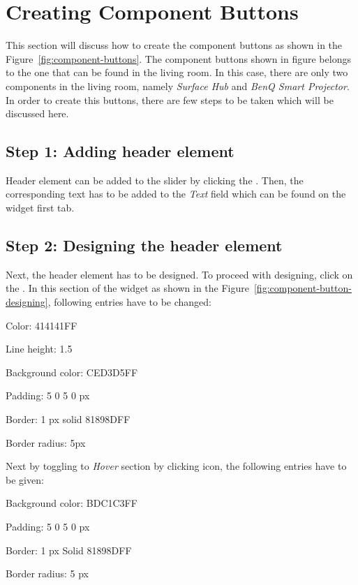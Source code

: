 \section{Creating Component Buttons}
This section will discuss how to create the component buttons as shown in the Figure~\ref{fig:component-buttons}. The component buttons shown in figure belongs to the one that can be found in the living room. In this case, there are only two components in the living room, namely \emph{Surface Hub} and \emph{BenQ Smart Projector}. In order to create this buttons, there are few steps to be taken which will be discussed here.

\subsection*{Step 1: Adding header element}
Header element can be added to the slider by clicking the . Then, the corresponding text has to be added to the \emph{Text} field which can be found on the widget first tab.

\subsection*{Step 2: Designing the header element}
Next, the header element has to be designed. To proceed with designing, click on the . In this section of the widget as shown in the Figure~\ref{fig:component-button-designing}, following entries have to be changed:
\begin{itemize*}
\item Color: 414141FF
\item Line height: 1.5
\item Background color: CED3D5FF
\item Padding: 5 0 5 0 px
\item Border: 1 px solid 81898DFF
\item Border radius: 5px
\end{itemize*}

Next by toggling to \emph{Hover} section by clicking  icon, the following entries have to be given:
\begin{itemize*}
\item Background color: BDC1C3FF
\item Padding: 5 0 5 0 px
\item Border: 1 px Solid 81898DFF
\item Border radius: 5 px
\end{itemize*}

